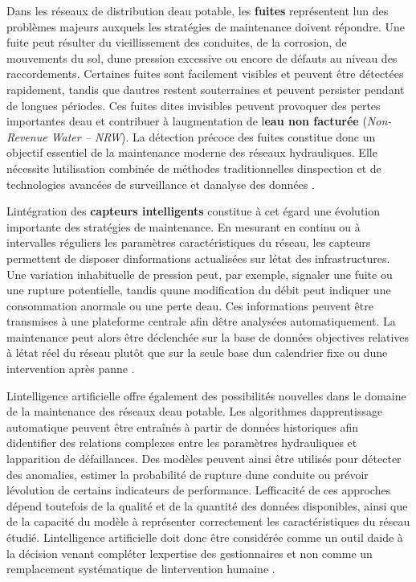 \documentclass[12pt,a4paper,oneside]{report}
\begin{document}
Dans les réseaux de distribution d\textquotesingle eau potable, les
\textbf{fuites} représentent l\textquotesingle un des problèmes majeurs
auxquels les stratégies de maintenance doivent répondre. Une fuite peut
résulter du vieillissement des conduites, de la corrosion, de mouvements
du sol, d\textquotesingle une pression excessive ou encore de défauts au
niveau des raccordements. Certaines fuites sont facilement visibles et
peuvent être détectées rapidement, tandis que d\textquotesingle autres
restent souterraines et peuvent persister pendant de longues périodes.
Ces fuites dites invisibles peuvent provoquer des pertes importantes
d\textquotesingle eau et contribuer à l\textquotesingle augmentation de
l\textquotesingle{}\textbf{eau non facturée} (\emph{Non-Revenue Water --
NRW}). La détection précoce des fuites constitue donc un objectif
essentiel de la maintenance moderne des réseaux hydrauliques. Elle
nécessite l\textquotesingle utilisation combinée de méthodes
traditionnelles d\textquotesingle inspection et de technologies avancées
de surveillance et d\textquotesingle analyse des données \cite{ref50}.

L\textquotesingle intégration des \textbf{capteurs intelligents}
constitue à cet égard une évolution importante des stratégies de
maintenance. En mesurant en continu ou à intervalles réguliers les
paramètres caractéristiques du réseau, les capteurs permettent de
disposer d\textquotesingle informations actualisées sur
l\textquotesingle état des infrastructures. Une variation inhabituelle
de pression peut, par exemple, signaler une fuite ou une rupture
potentielle, tandis qu\textquotesingle une modification du débit peut
indiquer une consommation anormale ou une perte d\textquotesingle eau.
Ces informations peuvent être transmises à une plateforme centrale afin
d\textquotesingle être analysées automatiquement. La maintenance peut
alors être déclenchée sur la base de données objectives relatives à
l\textquotesingle état réel du réseau plutôt que sur la seule base
d\textquotesingle un calendrier fixe ou d\textquotesingle une
intervention après panne \cite{ref20}.

L\textquotesingle intelligence artificielle offre également des
possibilités nouvelles dans le domaine de la maintenance des réseaux
d\textquotesingle eau potable. Les algorithmes
d\textquotesingle apprentissage automatique peuvent être entraînés à
partir de données historiques afin d\textquotesingle identifier des
relations complexes entre les paramètres hydrauliques et
l\textquotesingle apparition de défaillances. Des modèles peuvent ainsi
être utilisés pour détecter des anomalies, estimer la probabilité de
rupture d\textquotesingle une conduite ou prévoir
l\textquotesingle évolution de certains indicateurs de performance.
L\textquotesingle efficacité de ces approches dépend toutefois de la
qualité et de la quantité des données disponibles, ainsi que de la
capacité du modèle à représenter correctement les caractéristiques du
réseau étudié. L\textquotesingle intelligence artificielle doit donc
être considérée comme un outil d\textquotesingle aide à la décision
venant compléter l\textquotesingle expertise des gestionnaires et non
comme un remplacement systématique de l\textquotesingle intervention
humaine \cite{ref51}.
\end{document}
